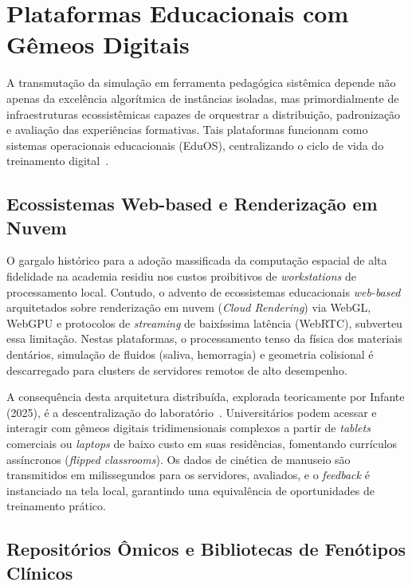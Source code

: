 \section{Plataformas Educacionais com Gêmeos Digitais}
\label{sec:plataformas-educ}

A transmutação da simulação em ferramenta pedagógica sistêmica depende não apenas da excelência algorítmica de instâncias isoladas, mas primordialmente de infraestruturas ecossistêmicas capazes de orquestrar a distribuição, padronização e avaliação das experiências formativas. Tais plataformas funcionam como sistemas operacionais educacionais (EduOS), centralizando o ciclo de vida do treinamento digital~\cite{mdpi2025convergence}.

\subsection{Ecossistemas Web-based e Renderização em Nuvem}
\label{subsec:web}

O gargalo histórico para a adoção massificada da computação espacial de alta fidelidade na academia residiu nos custos proibitivos de \textit{workstations} de processamento local. Contudo, o advento de ecossistemas educacionais \textit{web-based} arquitetados sobre renderização em nuvem (\textit{Cloud Rendering}) via WebGL, WebGPU e protocolos de \textit{streaming} de baixíssima latência (WebRTC), subverteu essa limitação. Nestas plataformas, o processamento tenso da física dos materiais dentários, simulação de fluidos (saliva, hemorragia) e geometria colisional é descarregado para clusters de servidores remotos de alto desempenho.

A consequência desta arquitetura distribuída, explorada teoricamente por Infante (2025), é a descentralização do laboratório~\cite{infante2025distributed}. Universitários podem acessar e interagir com gêmeos digitais tridimensionais complexos a partir de \textit{tablets} comerciais ou \textit{laptops} de baixo custo em suas residências, fomentando currículos assíncronos (\textit{flipped classrooms}). Os dados de cinética de manuseio são transmitidos em milissegundos para os servidores, avaliados, e o \textit{feedback} é instanciado na tela local, garantindo uma equivalência de oportunidades de treinamento prático.

\subsection{Repositórios Ômicos e Bibliotecas de Fenótipos Clínicos}
\label{subsec:repositorios}

